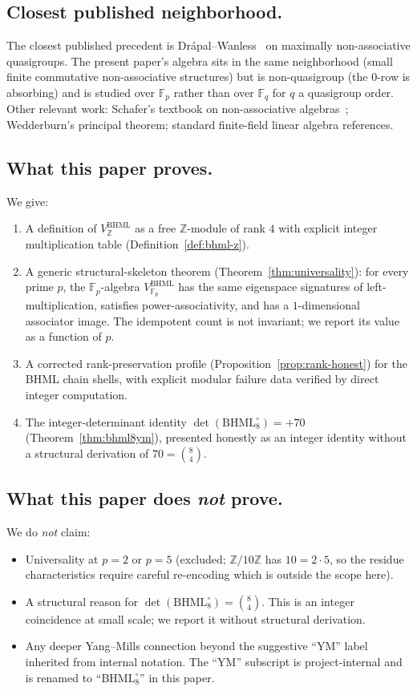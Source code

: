 \documentclass[11pt,reqno]{amsart}
\theoremstyle{plain}
\theoremstyle{definition}
\theoremstyle{remark}
\newcommand{\Z}{\mathbb{Z}}
\newcommand{\F}{\mathbb{F}}
\newcommand{\BHML}{\mathrm{BHML}}
\begin{document}
\subsection{Closest published neighborhood.}
The closest published precedent is Drápal--Wanless~\cite{DrapalWanless2021}
on maximally non-associative quasigroups. The present paper's algebra
sits in the same neighborhood (small finite commutative
non-associative structures) but is non-quasigroup (the $0$-row is
absorbing) and is studied over $\F_{p}$ rather than over $\F_{q}$ for
$q$ a quasigroup order. Other relevant work: Schafer's textbook on
non-associative algebras~\cite{Schafer1966}; Wedderburn's principal
theorem; standard finite-field linear algebra references.

\subsection{What this paper proves.}
We give:
\begin{enumerate}
\item A definition of $V^{\BHML}_{\Z}$ as a free $\Z$-module of rank
$4$ with explicit integer multiplication table
(Definition~\ref{def:bhml-z}).
\item A generic structural-skeleton theorem
(Theorem~\ref{thm:universality}): for every prime $p$, the
$\F_{p}$-algebra $V^{\BHML}_{\F_{p}}$ has the same eigenspace
signatures of left-multiplication, satisfies power-associativity,
and has a $1$-dimensional associator image. The idempotent count is
not invariant; we report its value as a function of $p$.
\item A corrected rank-preservation profile
(Proposition~\ref{prop:rank-honest}) for the BHML chain shells, with
explicit modular failure data verified by direct integer computation.
\item The integer-determinant identity
$\det(\BHML_{8}^{\circ}) = +70$
(Theorem~\ref{thm:bhml8ym}), presented honestly as an integer
identity without a structural derivation of $70 = \binom{8}{4}$.
\end{enumerate}

\subsection{What this paper does \emph{not} prove.}
We do \emph{not} claim:
\begin{itemize}
\item Universality at $p = 2$ or $p = 5$ (excluded; $\Z/10\Z$ has
$10 = 2 \cdot 5$, so the residue characteristics require careful
re-encoding which is outside the scope here).
\item A structural reason for $\det(\BHML_{8}^{\circ}) =
\binom{8}{4}$. This is an integer coincidence at small scale; we
report it without structural derivation.
\item Any deeper Yang--Mills connection beyond the suggestive
``YM'' label inherited from internal notation. The ``YM'' subscript
is project-internal and is renamed to ``$\BHML_{8}^{\circ}$'' in
this paper.
\end{itemize}
\end{document}
